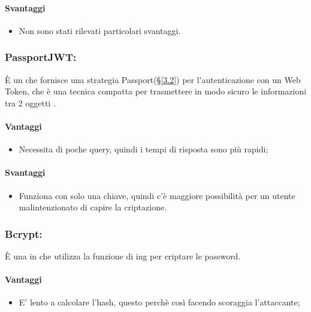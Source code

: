 	\paragraph{Svantaggi}
	\begin{itemize}
	\item Non sono stati rilevati particolari svantaggi.
	\end{itemize}

	\subsubsection{PassportJWT:} È un  che fornisce una strategia Passport(\S\ref{3.2}) per l'autenticazione con un  Web Token, che è una tecnica compatta per trasmettere in modo sicuro le informazioni tra 2 oggetti .
	\paragraph{Vantaggi}
	\begin{itemize}
	\item Necessita di poche query, quindi i tempi di risposta sono più rapidi;
	\end{itemize}
	
	\paragraph{Svantaggi}
	\begin{itemize}
	\item Funziona con solo una chiave, quindi c'è maggiore possibilità per un utente malintenzionato di capire la criptazione.
	\end{itemize}

	\subsubsection{Bcrypt:} È una  in  che utilizza la funzione di ing per criptare le password.
	\paragraph{Vantaggi}
	\begin{itemize}
	\item E' lento a calcolare l'hash, questo perchè così facendo scoraggia l'attaccante;
	\end{itemize}

